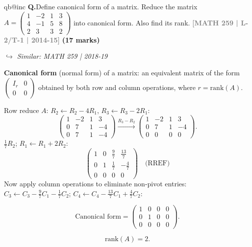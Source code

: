 \documentclass[12pt,a3paper]{article}
\makeatletter
\newcommand{\yr}[1]{\hfill\textcolor{gray}{\small\textbf{[#1]}}}
\newcommand{\mk}[1]{\textcolor{orange!70!black}{\small\textbf{(#1 marks)}}}
\newcommand{\variant}[1]{\par\vspace{1pt}\textcolor{blue!50!black}%
  {\footnotesize\textit{$\hookrightarrow$ Similar: #1}}}
\newcounter{qnum}
\newcommand{\Q}[1]{%
  \csname qb@inc\endcsname
  \needspace{4\baselineskip}
  \refstepcounter{qnum}
  \vspace{6pt}
  \noindent\textbf{Q\theqnum.}\enspace #1\par
}
\makeatother
\begin{document}
\Q{Define canonical form of a matrix. Reduce the matrix $A = \begin{pmatrix} 1 & -2 & 1 & 3 \\ 4 & -1 & 5 & 8 \\ 2 & 3 & 3 & 2 \end{pmatrix}$ into canonical form. Also find its rank.
\yr{MATH 259 | L-2/T-1 | 2014-15} \mk{17}
\variant{MATH 259 | 2018-19}}

\begin{tcolorbox}[enhanced,breakable,
  colback=cB!4,colframe=cB,boxrule=0.8pt,arc=5pt,
  title={\textbf{Answer --- Canonical Form of $A=\begin{pmatrix}1&-2&1&3\\4&-1&5&8\\2&3&3&2\end{pmatrix}$; Rank}},
  fonttitle=\bfseries\color{white},colbacktitle=cB]

\textbf{Canonical form} (normal form) of a matrix: an equivalent matrix of the form
$\begin{pmatrix}I_r & 0 \\ 0 & 0\end{pmatrix}$ obtained by both row and column operations, where $r=\mathrm{rank}(A)$.

\medskip
Row reduce $A$: $R_2\leftarrow R_2-4R_1$, $R_3\leftarrow R_3-2R_1$:
\[
\begin{pmatrix}1&-2&1&3\\0&7&1&-4\\0&7&1&-4\end{pmatrix}
\xrightarrow{R_3-R_2}
\begin{pmatrix}1&-2&1&3\\0&7&1&-4\\0&0&0&0\end{pmatrix}.
\]
$\frac{1}{7}R_2$; $R_1\leftarrow R_1+2R_2$:
\[
\begin{pmatrix}1&0&\frac{9}{7}&\frac{13}{7}\\0&1&\frac{1}{7}&-\frac{4}{7}\\0&0&0&0\end{pmatrix} \quad\text{(RREF)}
\]
Now apply column operations to eliminate non-pivot entries:
$C_3\leftarrow C_3-\frac{9}{7}C_1-\frac{1}{7}C_2$; $C_4\leftarrow C_4-\frac{13}{7}C_1+\frac{4}{7}C_2$:

\[
\text{Canonical form} = \begin{pmatrix}1&0&0&0\\0&1&0&0\\0&0&0&0\end{pmatrix}.
\]

\[
\boxed{\mathrm{rank}(A) = 2.}
\]

\end{tcolorbox}
\end{document}
